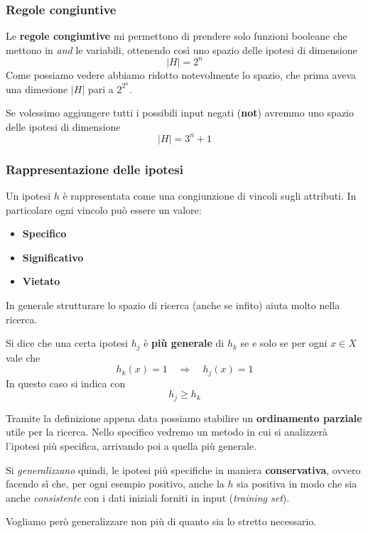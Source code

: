 \subsubsection{Regole congiuntive}
Le \textbf{regole congiuntive} mi permettono di prendere solo funzioni booleane che mettono in \emph{and} le
variabili, ottenendo cos\`i uno spazio delle ipotesi di dimensione
\[ |H| = 2^n \]
Come possiamo vedere abbiamo ridotto notevolmente lo spazio, che prima aveva una dimesione $|H|$ pari a $2^{2^n}$.

Se volessimo aggiungere tutti i possibili input negati (\textbf{not}) avremmo uno spazio delle ipotesi di dimensione
\[ |H| = 3^n + 1 \]

\subsubsection{Rappresentazione delle ipotesi}
Un ipotesi $h$ \`e rappresentata come una congiunzione di vincoli sugli attributi. In particolare ogni vincolo pu\`o
essere un valore:
\begin{itemize}
	\item \textbf{Specifico}
	\item \textbf{Significativo}
	\item \textbf{Vietato}
\end{itemize}
In generale strutturare lo spazio di ricerca (anche se infito) aiuta molto nella ricerca.

\begin{definition}
	Si dice che una certa ipotesi $h_j$ \`e \textbf{pi\`u generale} di $h_k$ se e solo se per ogni $x \in X$ vale che
	\[ h_k(x) = 1 \quad \Rightarrow \quad h_j(x) = 1 \]
	In questo caso si indica con
	\[ h_j \geq h_k \]
\end{definition}

Tramite la definizione appena data possiamo stabilire un \textbf{ordinamento parziale} utile per la ricerca.
Nello specifico vedremo un metodo in cui si analizzer\`a l'ipotesi pi\`u specifica, arrivando poi a quella pi\`u generale.

Si \emph{generalizzano} quindi, le ipotesi pi\`u specifiche in maniera \textbf{conservativa}, ovvero facendo s\`i che, per
ogni esempio positivo, anche la $h$ sia positiva in modo che sia anche \emph{consistente} con i dati iniziali forniti in
input (\emph{training set}).

Vogliamo per\`o generalizzare non pi\`u di quanto sia lo stretto necessario.

